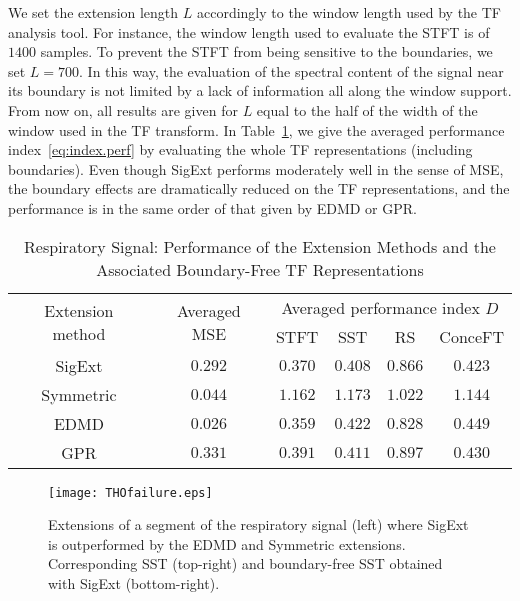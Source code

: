 We set the extension length $L$ accordingly to the window length used by the TF analysis tool. For instance, the window length used to evaluate the STFT is of $1400$ samples. To prevent the STFT from being sensitive to the boundaries, we set $L=700$. In this way, the evaluation of the spectral content of the signal near its boundary is not limited by a lack of information all along the window support. From now on, all results are given for $L$ equal to the half of the width of the window used in the TF transform.
%
In Table~\ref{tab:THO}, we give the averaged performance index~\eqref{eq:index.perf} by evaluating the whole TF representations (including boundaries). Even though {\sf SigExt} performs moderately well in the sense of MSE, the boundary effects are dramatically reduced on the TF representations, and the performance is in the same order of that given by EDMD or GPR. 


\begin{table}
\centering
\caption{Respiratory Signal: Performance of the Extension Methods and the Associated Boundary-Free TF Representations}
\begin{tabular}{|c||c||c|c|c|c|}
  \hline
   \multirow{2}{40pt}{\centering Extension method} & \multirow{2}{35pt}{\centering Averaged MSE} & \multicolumn{4}{c|}{Averaged performance index $D$} \\
   \cline{3-6}
      & & STFT & SST & RS & ConceFT \\
   \hhline{|=#=#=|=|=|=|}
   {\sf SigExt} & $0.292$ & $0.370$ &  $0.408$ & $0.866$ & $0.423$ \\
   \hline
   Symmetric & $0.044$ & $1.162$ & $1.173$ & $1.022$ & $1.144$ \\
   \hline
   EDMD & $0.026$ & $0.359$ &  $0.422$ & $0.828$ & $0.449$ \\
   \hline
   GPR & $0.331$ & $0.391$ &  $0.411$ & $0.897$ & $0.430$ \\ 
   \hline
\end{tabular}
\label{tab:THO}
\end{table}

\begin{figure}
\centering
\texttt{[image: THOfailure.eps]}
\caption{Extensions of a segment of the respiratory signal (left) where {\sf SigExt} is outperformed by the EDMD and Symmetric extensions. Corresponding SST (top-right) and boundary-free SST obtained with {\sf SigExt} (bottom-right).}
\label{fig:THO.failure}
\end{figure} 


